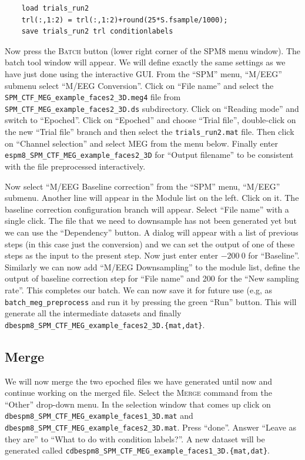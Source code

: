\begin{verbatim}
    load trials_run2
    trl(:,1:2) = trl(:,1:2)+round(25*S.fsample/1000);
    save trials_run2 trl conditionlabels
\end{verbatim}

Now press the \textsc{Batch} button (lower right corner of the SPM8 menu window). The batch tool window will appear. We will define exactly the same settings as we have just done using the interactive GUI. From the ``SPM'' menu, ``M/EEG'' submenu select ``M/EEG Conversion''. Click on ``File name'' and select the \texttt{SPM\_CTF\_MEG\_example\_faces2\_3D.meg4} file from \texttt{SPM\_CTF\_\-MEG\_\-example\_\-faces2\_3D.ds} subdirectory. Click on ``Reading mode'' and switch to ``Epoched''. Click on ``Epoched'' and choose ``Trial file'', double-click on the new ``Trial file'' branch and then select the \texttt{trials\_run2.mat} file.  Then click on ``Channel selection'' and select MEG from the menu below. Finally enter \texttt{espm8\_SPM\_CTF\_MEG\_example\_faces2\_3D} for ``Output filename'' to be consistent with the file preprocessed interactively.

Now select ``M/EEG Baseline correction'' from the ``SPM'' menu, ``M/EEG'' submenu. Another line will appear in the Module list on the left. Click on it. The baseline correction configuration branch will appear. Select ``File name'' with a single click. The file that we need to downsample has not been generated yet but we can use the ``Dependency'' button. A dialog will appear with a list of previous steps (in this case just the conversion) and we can set the output of one of these steps as the input to the present step. Now just enter enter $-200\: 0$ for ``Baseline''. Similarly we can now add ``M/EEG Downsampling'' to the module list, define the output of baseline correction step for ``File name'' and 200 for the ``New sampling rate''. This completes our batch. We can now save it for future use (e.g, as \texttt{batch\_meg\_preprocess} and run it by pressing the green ``Run'' button. This will generate all the intermediate datasets and finally \texttt{dbespm8\_SPM\_CTF\_MEG\_example\_faces2\_3D.\{mat,dat\}}.

\subsection{Merge}

We will now merge the two epoched files we have generated until now and continue working on the merged file. Select the \textsc{Merge} command from the ``Other'' drop-down menu. In the selection window that comes up click on \texttt{dbespm8\_SPM\_CTF\_MEG\_example\_faces1\_3D.mat} and \texttt{dbespm8\_SPM\_CTF\_MEG\_example\_faces2\_3D.mat}. Press ``done''. Answer ``Leave as they are'' to ``What to do with condition labels?''. A new dataset will be generated called \texttt{cdbespm8\_SPM\_CTF\_\-MEG\_\-example\_\-faces1\_\-3D.\{mat,dat\}}.

